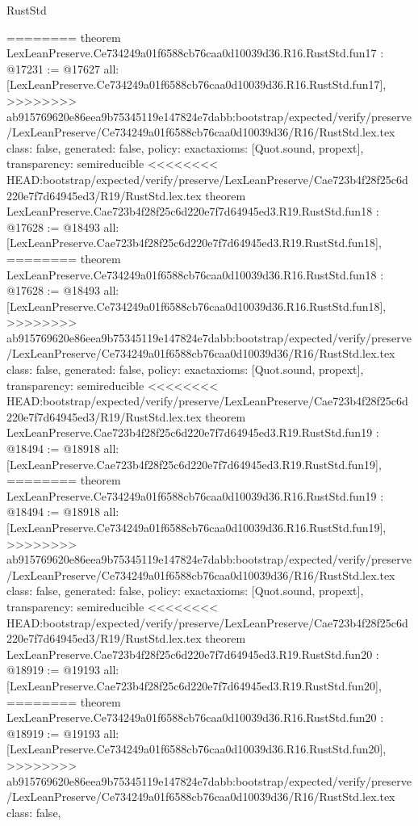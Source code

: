 \begin{lexlean}{RustStd}
\begin{coremodule}
{\begin{coremodule}
{{{{{{{{{{{{{{{{{{{{========
theorem LexLeanPreserve.Ce734249a01f6588cb76caa0d10039d36.R16.RustStd.fun17 : @17231 := @17627 {
  all: [LexLeanPreserve.Ce734249a01f6588cb76caa0d10039d36.R16.RustStd.fun17],
>>>>>>>> ab915769620e86eea9b75345119e147824e7dabb:bootstrap/expected/verify/preserve/LexLeanPreserve/Ce734249a01f6588cb76caa0d10039d36/R16/RustStd.lex.tex
  class: false,
  generated: false,
  policy: exact{axioms: [Quot.sound, propext]},
  transparency: semireducible
}
<<<<<<<< HEAD:bootstrap/expected/verify/preserve/LexLeanPreserve/Cae723b4f28f25c6d220e7f7d64945ed3/R19/RustStd.lex.tex
theorem LexLeanPreserve.Cae723b4f28f25c6d220e7f7d64945ed3.R19.RustStd.fun18 : @17628 := @18493 {
  all: [LexLeanPreserve.Cae723b4f28f25c6d220e7f7d64945ed3.R19.RustStd.fun18],
========
theorem LexLeanPreserve.Ce734249a01f6588cb76caa0d10039d36.R16.RustStd.fun18 : @17628 := @18493 {
  all: [LexLeanPreserve.Ce734249a01f6588cb76caa0d10039d36.R16.RustStd.fun18],
>>>>>>>> ab915769620e86eea9b75345119e147824e7dabb:bootstrap/expected/verify/preserve/LexLeanPreserve/Ce734249a01f6588cb76caa0d10039d36/R16/RustStd.lex.tex
  class: false,
  generated: false,
  policy: exact{axioms: [Quot.sound, propext]},
  transparency: semireducible
}
<<<<<<<< HEAD:bootstrap/expected/verify/preserve/LexLeanPreserve/Cae723b4f28f25c6d220e7f7d64945ed3/R19/RustStd.lex.tex
theorem LexLeanPreserve.Cae723b4f28f25c6d220e7f7d64945ed3.R19.RustStd.fun19 : @18494 := @18918 {
  all: [LexLeanPreserve.Cae723b4f28f25c6d220e7f7d64945ed3.R19.RustStd.fun19],
========
theorem LexLeanPreserve.Ce734249a01f6588cb76caa0d10039d36.R16.RustStd.fun19 : @18494 := @18918 {
  all: [LexLeanPreserve.Ce734249a01f6588cb76caa0d10039d36.R16.RustStd.fun19],
>>>>>>>> ab915769620e86eea9b75345119e147824e7dabb:bootstrap/expected/verify/preserve/LexLeanPreserve/Ce734249a01f6588cb76caa0d10039d36/R16/RustStd.lex.tex
  class: false,
  generated: false,
  policy: exact{axioms: [Quot.sound, propext]},
  transparency: semireducible
}
<<<<<<<< HEAD:bootstrap/expected/verify/preserve/LexLeanPreserve/Cae723b4f28f25c6d220e7f7d64945ed3/R19/RustStd.lex.tex
theorem LexLeanPreserve.Cae723b4f28f25c6d220e7f7d64945ed3.R19.RustStd.fun20 : @18919 := @19193 {
  all: [LexLeanPreserve.Cae723b4f28f25c6d220e7f7d64945ed3.R19.RustStd.fun20],
========
theorem LexLeanPreserve.Ce734249a01f6588cb76caa0d10039d36.R16.RustStd.fun20 : @18919 := @19193 {
  all: [LexLeanPreserve.Ce734249a01f6588cb76caa0d10039d36.R16.RustStd.fun20],
>>>>>>>> ab915769620e86eea9b75345119e147824e7dabb:bootstrap/expected/verify/preserve/LexLeanPreserve/Ce734249a01f6588cb76caa0d10039d36/R16/RustStd.lex.tex
  class: false,
}}}}}}}}}}}}}}}}}}}}}}}}
\end{coremodule}}
\end{coremodule}
\end{lexlean}
